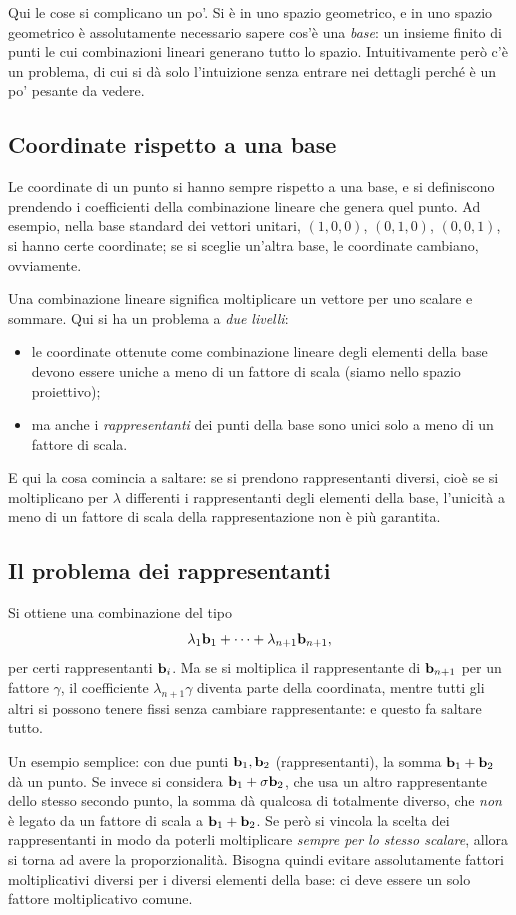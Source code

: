 Qui le cose si complicano un po'. Si è in uno spazio geometrico, e in uno spazio geometrico è assolutamente necessario sapere cos'è una \emph{base}: un insieme finito di punti le cui combinazioni lineari generano tutto lo spazio. Intuitivamente però c'è un problema, di cui si dà solo l'intuizione senza entrare nei dettagli perché è un po' pesante da vedere.

\subsection{Coordinate rispetto a una base}

Le coordinate di un punto si hanno sempre rispetto a una base, e si definiscono prendendo i coefficienti della combinazione lineare che genera quel punto. Ad esempio, nella base standard dei vettori unitari, $(1,0,0)$, $(0,1,0)$, $(0,0,1)$, si hanno certe coordinate; se si sceglie un'altra base, le coordinate cambiano, ovviamente.

Una combinazione lineare significa moltiplicare un vettore per uno scalare e sommare. Qui si ha un problema a \emph{due livelli}:
\begin{itemize}
  \item le coordinate ottenute come combinazione lineare degli elementi della base devono essere uniche a meno di un fattore di scala (siamo nello spazio proiettivo);
  \item ma anche i \emph{rappresentanti} dei punti della base sono unici solo a meno di un fattore di scala.
\end{itemize}
E qui la cosa comincia a saltare: se si prendono rappresentanti diversi, cioè se si moltiplicano per $\lambda$ differenti i rappresentanti degli elementi della base, l'unicità a meno di un fattore di scala della rappresentazione non è più garantita.

\subsection{Il problema dei rappresentanti}

Si ottiene una combinazione del tipo
\[
  \lambda_1\mathbf{b}_1+\dots+\lambda_{n+1}\mathbf{b}_{n+1},
\]
per certi rappresentanti $\mathbf{b}_i$. Ma se si moltiplica il rappresentante di $\mathbf{b}_{n+1}$ per un fattore $\gamma$, il coefficiente $\lambda_{n+1}\gamma$ diventa parte della coordinata, mentre tutti gli altri si possono tenere fissi senza cambiare rappresentante: e questo fa saltare tutto.

Un esempio semplice: con due punti $\mathbf{b}_1,\mathbf{b}_2$ (rappresentanti), la somma $\mathbf{b}_1+\mathbf{b}_2$ dà un punto. Se invece si considera $\mathbf{b}_1+\sigma\mathbf{b}_2$, che usa un altro rappresentante dello stesso secondo punto, la somma dà qualcosa di totalmente diverso, che \emph{non} è legato da un fattore di scala a $\mathbf{b}_1+\mathbf{b}_2$. Se però si vincola la scelta dei rappresentanti in modo da poterli moltiplicare \emph{sempre per lo stesso scalare}, allora si torna ad avere la proporzionalità. Bisogna quindi evitare assolutamente fattori moltiplicativi diversi per i diversi elementi della base: ci deve essere un solo fattore moltiplicativo comune.

